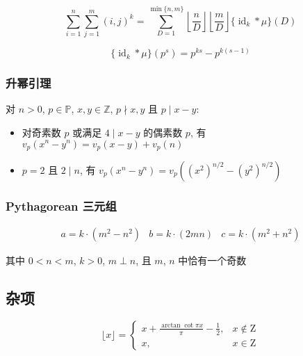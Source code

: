 \begin{equation}
    \sum_{i=1}^n\sum_{j=1}^m(i,j)^k=\sum_{D=1}^{\min\{n,m\}}\left\lfloor\frac{n}{D}\right\rfloor\left\lfloor\frac{m}{D}\right\rfloor\{\operatorname{id}_k*\mu\}(D)
\end{equation}

\begin{equation}
    \{\operatorname{id}_k*\mu\}(p^s)=p^{ks}-p^{k(s-1)}
\end{equation}

\subsubsection{升幂引理}

对 \(n>0\), \(p\in\mathbb{P}\), \(x,y\in\mathbb{Z}\), \(p\nmid x,y\) 且 \(p\mid x-y\):

\begin{itemize}
    \item 对奇素数 \(p\) 或满足 \(4\mid x-y\) 的偶素数 \(p\), 有 \(v_p\left(x^n-y^n\right)=v_p(x-y)+v_p(n)\)
    \item \(p=2\) 且 \(2\mid n\), 有 \(v_p\left(x^n-y^n\right)=v_p\left(\left(x^2\right)^{n/2}-\left(y^2\right)^{n/2}\right)\)
\end{itemize}

\subsubsection{Pythagorean 三元组}

\[
    \begin{array}{ccc}
        a=k\cdot\left(m^2-n^2\right) & b=k\cdot\left(2mn\right) & c=k\cdot\left(m^2+n^2\right)
    \end{array}
\]

其中 \(0<n<m\), \(k>0\), \(m\perp n\), 且 \(m\), \(n\) 中恰有一个奇数

\subsection{杂项}

\begin{equation}
    \lfloor x\rfloor=\begin{cases}
        \displaystyle x+\frac{\arctan\cot\pi x}{\pi}-\frac{1}{2}, & x\notin\mathrm{Z} \\
        x,                                                        & x\in\mathrm{Z}
    \end{cases}
\end{equation}

